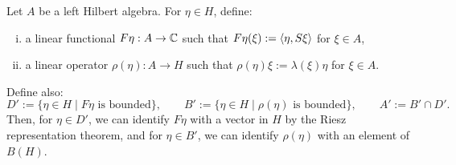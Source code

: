 \documentclass{../../small}
\begin{document}
\begin{defn}
Let $A$ be a left Hilbert algebra.
For $\eta\in H$, define:
\begin{enumerate}[(i)]
\item a linear functional $F\eta:A\to\mathbb{C}$ such that $F\eta(\xi):=\langle\eta,S\xi\rangle$ for $\xi\in A$,
\item a linear operator $\rho(\eta):A\to H$ such that $\rho(\eta)\xi:=\lambda(\xi)\eta$ for $\xi\in A$.
\end{enumerate}
Define also:
\[D':=\{\eta\in H\mid F\eta\text{ is bounded}\},\qquad
B':=\{\eta\in H\mid \rho(\eta)\text{ is bounded}\},\qquad
A':=B'\cap D'.\]
Then, for $\eta\in D'$, we can identify $F\eta$ with a vector in $H$ by the Riesz representation theorem, and for $\eta\in B'$, we can identify $\rho(\eta)$ with an element of $B(H)$.
\end{defn}
\end{document}

